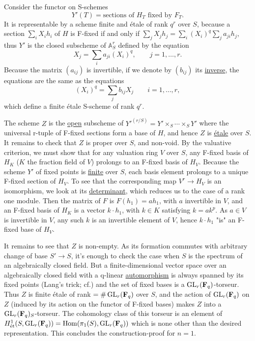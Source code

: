 \begin{kaproof}
Consider the functor on S-schemes
\[
Y'(T) = \text{sections of } H_T \text{ fixed by } F_T.
\]
It is representable by a scheme finite and \'etale of rank $q^r$ over $S$,
because a section $\sum_i X_ih_i$ of $H$ is F-fixed if and only if
$\sum_j X_jh_j=\sum_i (X_i)^q\sum_j a_{ji}h_j$, thus $Y'$ is the closed
subscheme of $\mathbb{A}^r_S$ defined by the equation
\[
X_j = \sum_i a_{ji}(X_i)^q,\qquad j=1,\dots,r .
\]
Because the matrix $(a_{ij})$ is invertible, if we denote by $(b_{ij})$ its
\uline{inverse}, the equations are the same as the equations
\[
(X_i)^q = \sum_j b_{ij}X_j\qquad i=1,\dots,r ,
\]
which define a finite \'etale S-scheme of rank $q^r$.

The scheme $Z$ is the \uline{open} subscheme of $Y'^{(r/S)}=Y'\times_S\cdots
\times_S Y'$ where the universal r-tuple of F-fixed sections form a base of
$H$, and hence $Z$ is \uline{\'etale} over $S$. It remains to check that $Z$ is
proper over $S$, and non-void. By the valuative criterion, we must show that for
any valuation ring $V$ over $S$, any F-fixed basis of $H_K$ ($K$ the fraction
field of $V$) prolongs to an F-fixed basis of $H_V$. Because the scheme $Y'$ of
fixed points is \uline{finite} over $S$, each basis element prolongs to a
unique F-fixed section of $H_V$. To see that the corresponding map
$V^r\to H_V$ is an isomorphism, we look at its \uline{determinant}, which
reduces us to the case of a rank one module. Then the matrix of $F$ is
$F(h_1)=ah_1$, with $a$ invertible in $V$, and an F-fixed basis of $H_K$ is a
vector $k\cdot h_1$, with $k\in K$ satisfying $k=ak^p$. As $a\in V$ is
invertible in $V$, any such $k$ is an invertible element of $V$, hence
$k\cdot h_1$ "is" an F-fixed base of $H_V$.

It remains to see that $Z$ is non-empty. As its formation commutes with
arbitrary change of base $S'\to S$, it's enough to check the case when $S$ is
the spectrum of an algebraically closed field. But a finite-dimensional vector
space over an algebraically closed field with a q-linear \uline{automorphism}
is always spanned by its fixed points (Lang's trick; cf.\cite{katz69}) and the set of
fixed bases is a $\operatorname{GL}_r(\mathbf{F}_q)$-torseur. Thus $Z$ is finite \'etale of rank
$=\#\operatorname{GL}_r(\mathbf{F}_q)$ over $S$, and the action of $\operatorname{GL}_r(\mathbf{F}_q)$ on $Z$ (induced by
its action on the functor of F-fixed bases) makes $Z$ into a
$\operatorname{GL}_r(\mathbf{F}_q)_S$-torseur. The cohomology class of this torseur is an element of
$H^1_{\text{\'et}}(S,\operatorname{GL}_r(\mathbf{F}_q))=\operatorname{Hom}(\pi_1(S),\operatorname{GL}_r(\mathbf{F}_q))$ which is none
other than the desired representation. This concludes the construction-proof
for $n=1$.


\end{kaproof}
